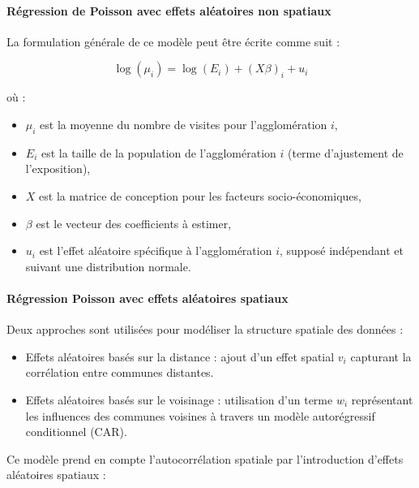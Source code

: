 \documentclass[
]{article}
\providecommand{\tightlist}{%
  \setlength{\itemsep}{0pt}\setlength{\parskip}{0pt}}
\begin{document}
\hypertarget{ruxe9gression-de-poisson-avec-effets-aluxe9atoires-non-spatiaux}{%
\paragraph{Régression de Poisson avec effets aléatoires non
spatiaux}\label{ruxe9gression-de-poisson-avec-effets-aluxe9atoires-non-spatiaux}}

La formulation générale de ce modèle peut être écrite comme suit :

\[
\log(\mu_i) = \log(E_i) + (X\beta)_i + u_i
\]

où :

\begin{itemize}
\tightlist
\item
  \(\mu_i\) est la moyenne du nombre de visites pour l'agglomération
  \(i\),
\item
  \(E_i\) est la taille de la population de l'agglomération \(i\) (terme
  d'ajustement de l'exposition),
\item
  \(X\) est la matrice de conception pour les facteurs
  socio-économiques,
\item
  \(\beta\) est le vecteur des coefficients à estimer,
\item
  \(u_i\) est l'effet aléatoire spécifique à l'agglomération \(i\),
  supposé indépendant et suivant une distribution normale.
\end{itemize}

\hypertarget{ruxe9gression-poisson-avec-effets-aluxe9atoires-spatiaux}{%
\paragraph{Régression Poisson avec effets aléatoires
spatiaux}\label{ruxe9gression-poisson-avec-effets-aluxe9atoires-spatiaux}}

Deux approches sont utilisées pour modéliser la structure spatiale des
données :

\begin{itemize}
\item
  Effets aléatoires basés sur la distance : ajout d'un effet spatial
  \(v_i\) capturant la corrélation entre communes distantes.
\item
  Effets aléatoires basés sur le voisinage : utilisation d'un terme
  \(w_i\) représentant les influences des communes voisines à travers un
  modèle autorégressif conditionnel (CAR).
\end{itemize}

Ce modèle prend en compte l'autocorrélation spatiale par l'introduction
d'effets aléatoires spatiaux :
\end{document}
